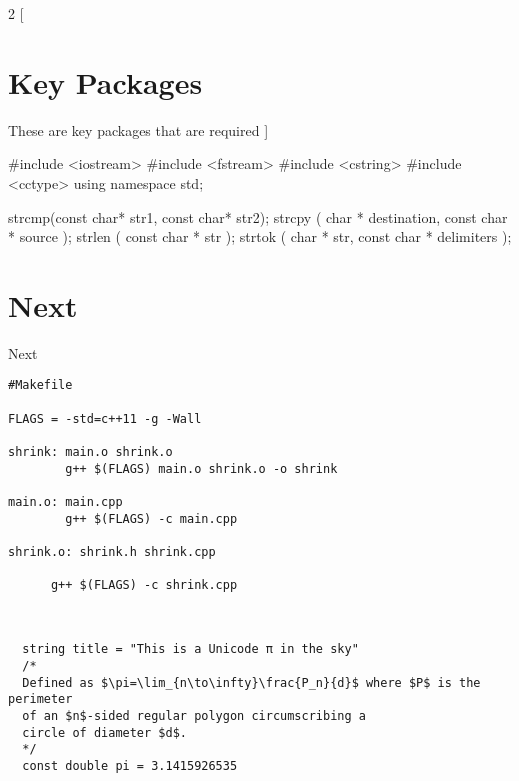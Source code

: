 \documentclass[10pt]{article}
\begin{document}
\begin{multicols}{2}
[
\section{Key Packages}
These are key packages that are required
]


\begin{cppcode}
  #include <iostream>
  #include <fstream>
  #include <cstring>
  #include <cctype>
  using namespace std;  
\end{cppcode}

\begin{cppcode}
strcmp(const char* str1, const char* str2);
strcpy ( char * destination, const char * source );
strlen ( const char * str );
strtok ( char * str, const char * delimiters );

\end{cppcode}

\end{multicols}

\section{Next}
Next

\begin{verbatim}
#Makefile

FLAGS = -std=c++11 -g -Wall

shrink: main.o shrink.o
        g++ $(FLAGS) main.o shrink.o -o shrink

main.o: main.cpp
        g++ $(FLAGS) -c main.cpp

shrink.o: shrink.h shrink.cpp

      g++ $(FLAGS) -c shrink.cpp
      
\end{verbatim}

\begin{verbatim}
               
  string title = "This is a Unicode π in the sky"
  /*
  Defined as $\pi=\lim_{n\to\infty}\frac{P_n}{d}$ where $P$ is the perimeter
  of an $n$-sided regular polygon circumscribing a
  circle of diameter $d$.
  */
  const double pi = 3.1415926535
  
\end{verbatim}
\end{document}
